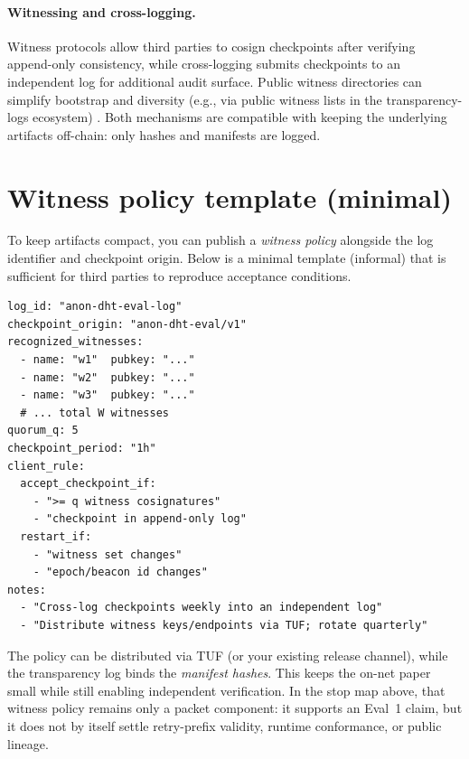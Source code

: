 \documentclass[11pt]{article}
\begin{document}
\paragraph{Witnessing and cross-logging.}
Witness protocols allow third parties to cosign checkpoints after verifying append-only consistency, while cross-logging submits checkpoints to an independent log for additional audit surface. Public witness directories can simplify bootstrap and diversity (e.g., via public witness lists in the transparency-logs ecosystem) \cite{c2sp_tlog_witness}.
Both mechanisms are compatible with keeping the underlying artifacts off-chain: only hashes and manifests are logged.


\section{Witness policy template (minimal)}
To keep artifacts compact, you can publish a \emph{witness policy} alongside the log identifier and checkpoint origin.
Below is a minimal template (informal) that is sufficient for third parties to reproduce acceptance conditions.

\begin{verbatim}
log_id: "anon-dht-eval-log"
checkpoint_origin: "anon-dht-eval/v1"
recognized_witnesses:
  - name: "w1"  pubkey: "..."
  - name: "w2"  pubkey: "..."
  - name: "w3"  pubkey: "..."
  # ... total W witnesses
quorum_q: 5
checkpoint_period: "1h"
client_rule:
  accept_checkpoint_if:
    - ">= q witness cosignatures"
    - "checkpoint in append-only log"
  restart_if:
    - "witness set changes"
    - "epoch/beacon id changes"
notes:
  - "Cross-log checkpoints weekly into an independent log"
  - "Distribute witness keys/endpoints via TUF; rotate quarterly"
\end{verbatim}

The policy can be distributed via TUF (or your existing release channel), while the transparency log binds the \emph{manifest hashes}.
This keeps the on-net paper small while still enabling independent verification.
In the stop map above, that witness policy remains only a packet component: it supports an Eval~1 claim, but it does not by itself settle retry-prefix validity, runtime conformance, or public lineage.
\end{document}
